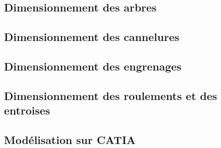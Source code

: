 \documentclass{config}
\begin{document}
\begin{spacing}{1.2}
\subsection{Dimensionnement des arbres}

\subsection{Dimensionnement des cannelures}

\subsection{Dimensionnement des engrenages}

\subsection{Dimensionnement des roulements et des entroises}

\subsection{Modélisation sur CATIA}

\end{spacing}
\end{document}
